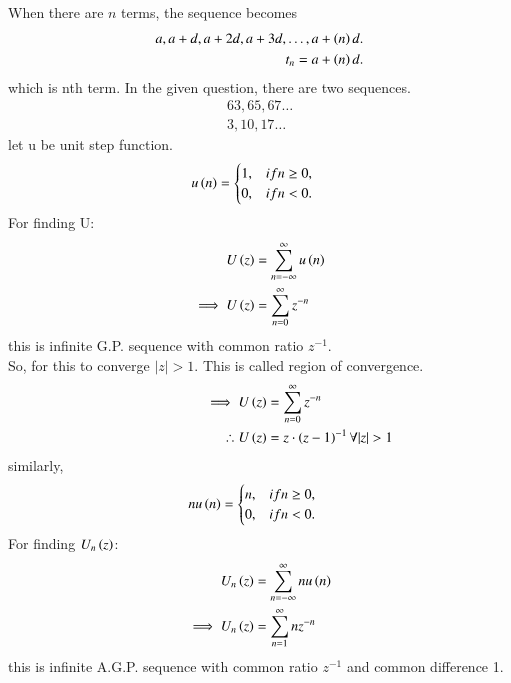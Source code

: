 \documentclass[journal,12pt,twocolumn]{IEEEtran}
\theoremstyle{remark}
\begin{document}
When there are $ n$ terms, the sequence becomes
\begin{align}
a, a+d, a+2d, a+3d,\dots, a+\left(n\right)d.\\
t_n = a+\left(n\right)d.
\end{align}
which is nth term.
In the given question, there are two sequences.
\begin{align}
63, 65, 67 \dots \label{eq:1}\\
3, 10, 17 \dots \label{eq:2}
\end{align}
let u be unit step function.\\
\begin{align}
u\left(n\right) &=
\begin{cases}
1, & if  n \geq 0, \\
0, & if  n < 0.
\end{cases}
\end{align}
For finding U:\\
\begin{align}
U\left(z\right) &= \sum_{n=-\infty}^{\infty} u\left(n\right)\\
\implies U\left(z\right) &= \sum_{n=0}^{\infty}z^{-n}
\end{align}
this is infinite G.P. sequence with common ratio $ z^{-1}$.\\
So, for this to converge $ |z|>1$. This is called region of convergence.\\
\begin{align}
\hspace{2cm}\implies U\brak{z} &= \sum_{n=0}^{\infty} z^{-n}\\
\hspace{2cm}\therefore U\brak{z} &= z\cdot\brak{z-1}^{-1} \forall |z|>1 \label{eq:6}
\end{align}
\hspace{3cm}similarly,\\
\begin{align}
nu\left(n\right) &=
\begin{cases}
n, & if  n \geq 0, \\
0, & if  n < 0.
\end{cases}
\end{align}
For finding $ U_n\left(z\right)$:\\
\begin{align}
U_n\left(z\right) &= \sum_{n=-\infty}^{\infty} nu\left(n\right)\\
\implies U_n\left(z\right) &= \sum_{n=1}^{\infty}nz^{-n}
\end{align}
this is infinite A.G.P. sequence with common ratio $ z^{-1}$ and common difference 1.\\
\end{document}
